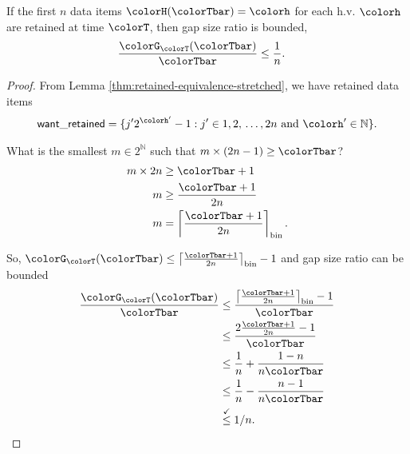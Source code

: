 \begin{lemma}
\label{thm:gap-size-ratio-stretched}
If the first $n$ data items $\colorH(\colorTbar) = \colorh$ for each h.v. $\colorh$ are retained at time $\colorT$, then gap size ratio is bounded,
\begin{align*}
\frac{\colorG_{\colorT}(\colorTbar)}{\colorTbar}
&\leq
\frac{1}{n}.
\end{align*}
\end{lemma}
\begin{proof}

From Lemma \ref{thm:retained-equivalence-stretched}, we have retained data items
\begin{align*}
\mathsf{want\_retained} =
\{
  j'2^{\colorh'} - 1
  :
  j' \in 1,2,\,\ldots,2n
  \text{ and }
  \colorh' \in \mathbb{N}
\}.
\end{align*}


What is the smallest $m \in 2^{\mathbb{N}}$ such that $m \times (2n - 1) \geq \colorTbar$?
\begin{align*}
m \times 2n
&\geq \colorTbar + 1\\
m
&\geq \frac{\colorTbar + 1}{2n}\\
m
&= \left\lceil \frac{\colorTbar + 1 }{2n} \right\rceil_{\mathrm{bin}}.
\end{align*}

So, $\colorG_{\colorT}(\colorTbar) \leq \left\lceil \frac{\colorTbar + 1 }{2n} \right\rceil_{\mathrm{bin}} - 1$ and gap size ratio can be bounded
\begin{align*}
\frac{\colorG_{\colorT}(\colorTbar)}{\colorTbar}
&\leq
\frac{
\left\lceil \frac{\colorTbar + 1 }{2n} \right\rceil_{\mathrm{bin}} - 1
}{
\colorTbar
}\\
&\leq
\frac{
2\frac{\colorTbar + 1}{2n} - 1
}{
\colorTbar
}\\
&\leq
\frac{1}{n} + \frac{1 - n}{n\colorTbar}\\
&\leq
\frac{1}{n} - \frac{n - 1}{n\colorTbar}\\
&\stackrel{\checkmark}{\leq}
1 / n.
\end{align*}


\end{proof}
